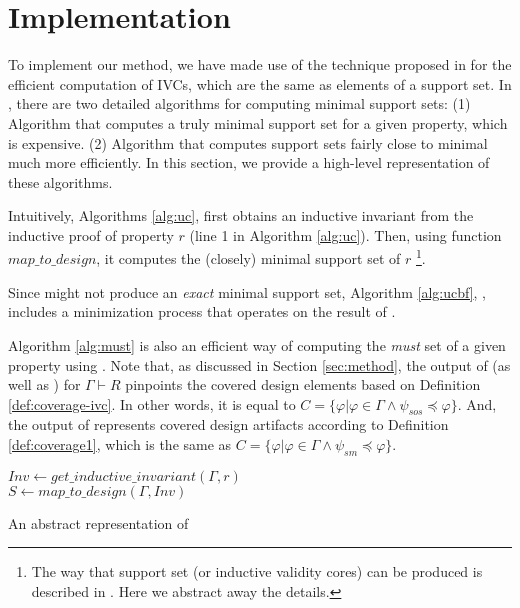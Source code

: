 \section{Implementation}
\label{sec:impl}

To implement our method, we have made use of the technique proposed in \cite{Ghass16} for the efficient computation of IVCs, which are the same as elements of a support set. In \cite{Ghass16}, there are two detailed algorithms for computing minimal support sets: (1) Algorithm \ucbfalg that computes a truly minimal support set for a given property, which is expensive. (2) Algorithm \ucalg that computes support sets fairly close to minimal much more efficiently. In this section, we provide a high-level representation of these algorithms.

Intuitively, Algorithms \ref{alg:uc},
first obtains an inductive invariant from the inductive proof of
property $r$ (line 1 in Algorithm \ref{alg:uc}). Then, using function $map\_to\_design$, it
computes the (closely) minimal support set of $r$ \footnote{The way that support set
(or inductive validity cores) can be produced is described in \cite{Ghass16}. Here we abstract away the details.}.

Since \ucalg might not produce an \emph{exact} minimal support set,
Algorithm \ref{alg:ucbf}, \ucbfalg, includes a minimization process that
operates on the result of \ucalg.

Algorithm \ref{alg:must} is also an efficient way of computing the \emph{must} set of a given property using \ucalg. Note that, as discussed in Section \ref{sec:method}, the
output of \ucalg (as well as \ucbfalg) for $\Gamma \vdash R$ pinpoints the covered design elements
based on Definition \ref{def:coverage-ivc}.
In other words, it is equal to
$C = \{\varphi | \varphi \in \Gamma \wedge  \psi_{sos} \preccurlyeq \varphi \}$.
And, the output of \mustalg represents covered design artifacts according to Definition \ref{def:coverage1}, which is the same as $C = \{\varphi | \varphi \in \Gamma \wedge \psi_{sm} \preccurlyeq \varphi \}$.

\begin{algorithm}
  \BlankLine
  $Inv \leftarrow get\_inductive\_invariant(\Gamma, r)$ \\
  $S \leftarrow map\_to\_design (\Gamma, Inv)$ \\
\caption{An abstract representation of \ucalg \cite{Ghass16}}
\label{alg:uc}
\end{algorithm}


